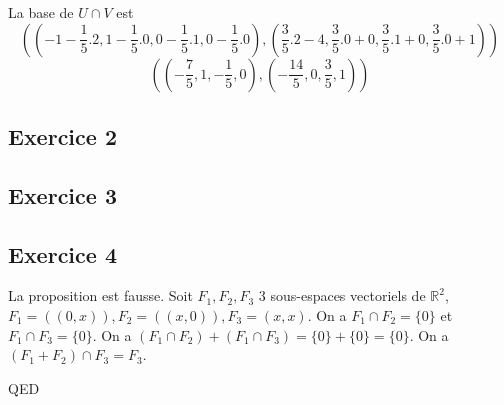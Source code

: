 \documentclass[]{book}
\theoremstyle{definition}
\newcommand{\bb}[1]{\mathbb{#1}}
\newcommand{\R}{\bb{R}}
\begin{document}
La base de $U \cap V$ est 
$$((-1-\frac{1}{5}.2, 1-\frac{1}{5}.0,0-\frac{1}{5}.1,0-\frac{1}{5}.0),(\frac{3}{5}.2-4, \frac{3}{5}.0+0, \frac{3}{5}.1+0, \frac{3}{5}.0+1))$$
$$((-\frac{7}{5},1,-\frac{1}{5},0),(-\frac{14}{5}, 0, \frac{3}{5}, 1))$$  

\subsection*{Exercice 2}


\subsection*{Exercice 3}



\subsection*{Exercice 4}
La proposition est fausse. Soit $F_1,F_2,F_3$ 3 sous-espaces vectoriels de $\R^2$, $F_1=((0,x)), F_2=((x,0)), F_3=(x,x)$. On a $F_1 \cap F_2 = \{0\}$ et $F_1 \cap F_3 = \{0\}$. On a $(F_1 \cap F_2) + (F_1 \cap F_3) = \{0\} + \{0\} = \{0\}$. On a $(F_1 + F_2) \cap F_3 = F_3$.


QED
\end{document}
